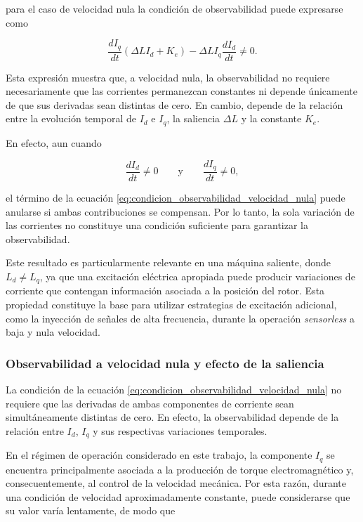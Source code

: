 para el caso de velocidad nula la condición de observabilidad puede expresarse
como

\begin{equation}
    \frac{d I_q}{dt}
    \left(\Delta L I_d + K_e\right)
    -
    \Delta L I_q
    \frac{d I_d}{dt}
    \neq 0.
    \label{eq:condicion_observabilidad_velocidad_nula}
\end{equation}

Esta expresión muestra que, a velocidad nula, la observabilidad no requiere
necesariamente que las corrientes permanezcan constantes ni depende únicamente
de que sus derivadas sean distintas de cero. En cambio, depende de la relación
entre la evolución temporal de $I_d$ e $I_q$, la saliencia $\Delta L$ y la
constante $K_e$.

En efecto, aun cuando

\begin{equation}
    \frac{d I_d}{dt}\neq0
    \qquad \text{y} \qquad
    \frac{d I_q}{dt}\neq0,
\end{equation}

el término de la ecuación
\eqref{eq:condicion_observabilidad_velocidad_nula} puede anularse si ambas
contribuciones se compensan. Por lo tanto, la sola variación de las corrientes
no constituye una condición suficiente para garantizar la observabilidad.

Este resultado es particularmente relevante en una máquina saliente, donde
$L_d\neq L_q$, ya que una excitación eléctrica apropiada puede producir
variaciones de corriente que contengan información asociada a la posición del
rotor. Esta propiedad constituye la base para utilizar estrategias de excitación
adicional, como la inyección de señales de alta frecuencia, durante la operación
\textit{sensorless} a baja y nula velocidad.


\subsubsection{Observabilidad a velocidad nula y efecto de la saliencia}

La condición de la ecuación
\eqref{eq:condicion_observabilidad_velocidad_nula} no requiere que las
derivadas de ambas componentes de corriente sean simultáneamente distintas
de cero. En efecto, la observabilidad depende de la relación entre
$I_d$, $I_q$ y sus respectivas variaciones temporales.

En el régimen de operación considerado en este trabajo, la componente
$I_q$ se encuentra principalmente asociada a la producción de torque
electromagnético y, consecuentemente, al control de la velocidad mecánica.
Por esta razón, durante una condición de velocidad aproximadamente
constante, puede considerarse que su valor varía lentamente, de modo que


